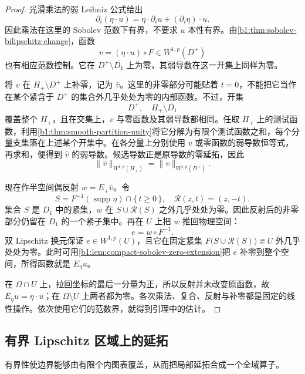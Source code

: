 \begin{proof}
光滑乘法的弱 Leibniz 公式给出
\[
 \partial_i(\eta\cdot u)=\eta\cdot\partial_i u+(\partial_i\eta)\cdot u.
\]
因此乘法在这里的 Sobolev 范数下有界，不要求 \(u\) 本性有界。由\cref{b1:thm:sobolev-bilipschitz-change}，函数
\[
 v=(\eta\cdot u)\circ F\in W^{1,p}(D^+)
\]
也有相应范数控制。它在 \(D^+\setminus\overline{D_1}\) 上为零，其弱导数在这一开集上同样为零。

将 \(v\) 在 \(H_+\setminus D^+\) 上补零，记为 \(\widehat v\)。这里的非零部分可能贴着 \(t=0\)，不能把它当作在某个紧含于 \(D^+\) 的集合外几乎处处为零的内部函数。不过，开集
\[
 D^+,\quad H_+\setminus\overline{D_1}
\]
覆盖整个 \(H_+\)，且在交集上，\(v\) 与零函数及其弱导数都相同。任取 \(H_+\) 上的测试函数，利用\cref{b1:thm:smooth-partition-unity}将它分解为有限个测试函数之和，每个分量支集落在上述某个开集中。在各分量上分别使用 \(v\) 或零函数的弱导数恒等式，再求和，便得到 \(\widehat v\) 的弱导数。候选导数正是原导数的零延拓，因此
\[
 \|\widehat v\|_{W^{1,p}(H_+)}=\|v\|_{W^{1,p}(D^+)}.
\]

现在作半空间偶反射 \(w=E_+\widehat v\)。令
\[
 S=F^{-1}(\operatorname{supp}\eta)\cap\{\,t\ge0\,\},
 \quad \mathcal R(z,t)=(z,-t).
\]
集合 \(S\) 是 \(D_1\) 中的紧集，\(w\) 在 \(S\cup\mathcal R(S)\) 之外几乎处处为零。因此反射后的非零部分仍留在 \(D_1\) 的一个紧子集中。再在 \(U\) 上把 \(w\) 推回物理空间：
\[
 e=w\circ F^{-1}.
\]
双 Lipschitz 换元保证 \(e\in W^{1,p}(U)\)，且它在固定紧集
\(F\bigl(S\cup\mathcal R(S)\bigr)\Subset U\) 外几乎处处为零。此时可用\cref{b1:lem:compact-sobolev-zero-extension}把 \(e\) 补零到整个空间，所得函数就是 \(E_\eta u\)。

在 \(\Omega\cap U\) 上，拉回坐标的最后一分量为正，所以反射并未改变原函数，故 \(E_\eta u=\eta\cdot u\)；在 \(\Omega\setminus U\) 上两者都为零。各次乘法、复合、反射与补零都是固定的线性操作。依次使用它们的范数界，就得到引理中的估计。
\end{proof}

\subsection{有界 Lipschitz 区域上的延拓}
\label{b1:subsec:220304}

有界性使边界能够由有限个内图表覆盖，从而把局部延拓合成一个全域算子。

